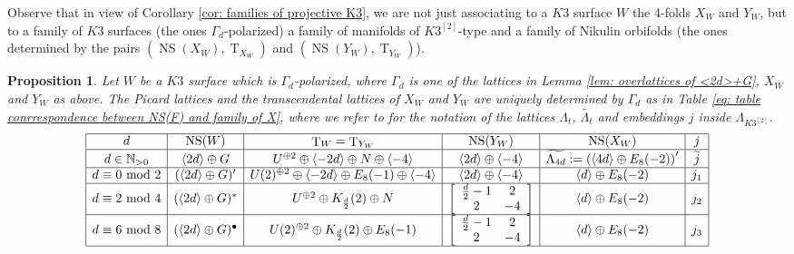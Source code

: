 \documentclass{amsart}
\newtheorem{prop}[thm]{Proposition}
\theoremstyle{definition}
\numberwithin{equation}{section}
\numberwithin{equation}{section} \theoremstyle{definition}
\DeclareMathOperator{\NS}{NS}
\DeclareMathOperator{\T}{T}
\begin{document}
Observe that in view of Corollary \ref{cor: families of projective K3}, we are not just associating to a $K3$ surface $W$ the 4-folds $X_W$ and $Y_W$, but to a family of $K3$ surfaces (the ones $\Gamma_d$-polarized) a family of manifolds of $K3^{[2]}$-type and a family of Nikulin orbifolds (the ones determined by the pairs $(\NS(X_W), \T_{X_W})$ and $(\NS(Y_W), \T_{Y_W})$).

\begin{prop}\label{prop:relation NS(F), NS(X), NS(W)}
Let $W$ be a $K3$ surface which is $\Gamma_d$-polarized, where $\Gamma_d$ is one of the lattices in Lemma \ref{lem: overlattices of <2d>+G}, $X_W$ and $Y_W$ as above. The Picard lattices and the transcendental lattices of $X_W$ and $Y_W$ are uniquely determined by $\Gamma_d$ as in Table \ref{eq: table conrrespondence between NS(F) and family of X}, where we refer to \cite[Section 2]{CGKK} for the notation of the lattices $\Lambda_{t}$, $\widetilde{\Lambda_t}$ and embeddings $j$ inside $\Lambda_{K3^{[2]}}$. 
\begin{align}\label{eq: table conrrespondence between NS(F) and family of X}\begin{array}{|c|c|c|c|c|c|}
\hline
d&\NS(W)&\T_W=\T_{Y_W}& \NS(Y_W)&\NS(X_W)&j\\
\hline  
d\in\mathbb{N}_{>0}&\langle 2d\rangle\oplus G&U^{\oplus 2}\oplus\langle -2d\rangle\oplus N\oplus \langle -4\rangle&\langle 2d\rangle\oplus \langle -4\rangle&\widetilde{\Lambda_{4d}}:=\left(\langle 4d\rangle\oplus E_8(-2)\right)'&\widetilde{j} \\
\hline
d\equiv 0\mbox{ mod }2&(\langle 2d\rangle\oplus G)'&U(2)^{\oplus 2}\oplus\langle -2d\rangle\oplus E_8(-1)\oplus \langle -4\rangle&\langle 2d\rangle\oplus \langle -4\rangle&\langle d\rangle\oplus E_8(-2)&j_1\\
\hline
d\equiv 2\mbox{ mod } 4&(\langle 2d\rangle\oplus G)^*&U^{\oplus 2}\oplus K_{\frac{d}{2}}(2)\oplus N &\left[\begin{array}{cc}\frac{d}{2}-1&2\\2&-4\end{array}\right]&\langle d\rangle\oplus E_8(-2)&j_2\\
\hline
d\equiv 6\mbox{ mod } 8&(\langle 2d\rangle\oplus G)^{\bullet}&U(2)^{\oplus 2}\oplus K_{\frac{d}{2}}(2)\oplus E_8(-1)&\left[\begin{array}{cc}\frac{d}{2}-1&2\\2&-4\end{array}\right]&\langle d\rangle\oplus E_8(-2)&j_3\\
\hline\end{array}\end{align}
\end{prop}
\end{document}

